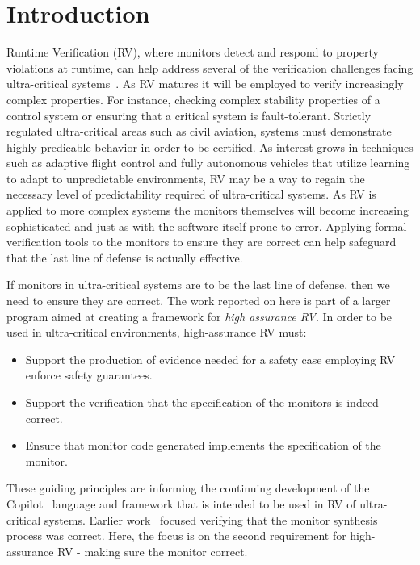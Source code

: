 \section{Introduction}\label{sec:intro}
Runtime Verification (RV), where monitors detect and respond to
property violations at runtime, can help address several of the
verification challenges facing ultra-critical
systems~\cite{pike-rv-11}.  As RV matures it will be employed to
verify increasingly complex properties. For instance, checking complex
stability properties of a control system or ensuring that a critical
system is fault-tolerant.  Strictly regulated ultra-critical areas
such as civil aviation, systems must demonstrate highly predicable
behavior in order to be certified. As interest grows in techniques
such as adaptive flight control and fully autonomous vehicles that
utilize learning to adapt to unpredictable environments, RV may be a
way to regain the necessary level of predictability required of
ultra-critical systems.  As RV is applied to more complex systems the
monitors themselves will become increasing sophisticated and just as
with the software itself prone to error.  Applying formal verification
tools to the monitors to ensure they are correct can help safeguard
that the last line of defense is actually effective.

  If monitors in ultra-critical
systems are to be the last line of defense, then we need to ensure
they are correct. The work reported on here is part of a larger
program aimed at creating a framework for \emph{high assurance RV}. In
order to be used in ultra-critical environments, high-assurance RV
must: 
\begin{itemize}
\item Support the production of evidence needed for a safety case
  employing RV enforce safety guarantees.
\item Support the verification that the specification of the monitors
  is indeed correct. 
\item Ensure that monitor code generated implements the specification of the
monitor. 
\end{itemize} 
 These guiding principles are informing the continuing development of the Copilot~\cite{copilot,pike-isse-13} language and framework that is
intended to be used in RV of ultra-critical systems.  Earlier
work~\cite{pike-icfp-12} focused verifying that the monitor synthesis
process was correct. Here, the focus is on the second requirement for
high-assurance RV - making sure the monitor  correct. 

